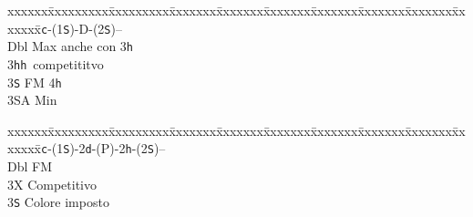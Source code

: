 \documentclass[a4paper,italian]{article}
\newcommand{\BS}{\small{\texttt{S}}}
\newcommand{\BC}{\small{\texttt{c}}}
\newcommand{\BD}{\small{\texttt{d}}}
\newcommand{\BH}{\small{\texttt{h}}}
\newenvironment{bidtable}
{\begin{tabbing}

    xxxxxx\=xxxxxxxxx\=xxxxxxxxx\=xxxxxxx\=xxxxxxx\=xxxxxxx\=xxxxxxx\=xxxxxxx\=xxxxxxx\=xxxxxxx\=\kill}
{\end{tabbing} }%
\newenvironment{sviluppi}
{\begin{tcolorbox}[colframe=azzurro,title=Sviluppi particolari]}
    {
\end{tcolorbox} }%
\begin{document}
\begin{multicols}{2}
    \begin{sviluppi}
        \begin{bidtable}
            1\BC-(1\BS)-D-(2\BS)--\+\\
            Dbl \> Max anche con 3\BH \\
            3\BH {}\BH\ competititvo\\
            3\BS \> FM 4\BH \+\\
            3\small{SA} \> Min\-\-
        \end{bidtable}
        \bigbreak
        \begin{bidtable}
            1\BC-(1\BS)-2\BD-(P)-2\BH-(2\BS)--\+\\
            Dbl \> FM\\
            3X \> Competitivo\\
            3\BS \> Colore imposto\-
        \end{bidtable}
    \end{sviluppi}


\end{multicols}
\end{document}
